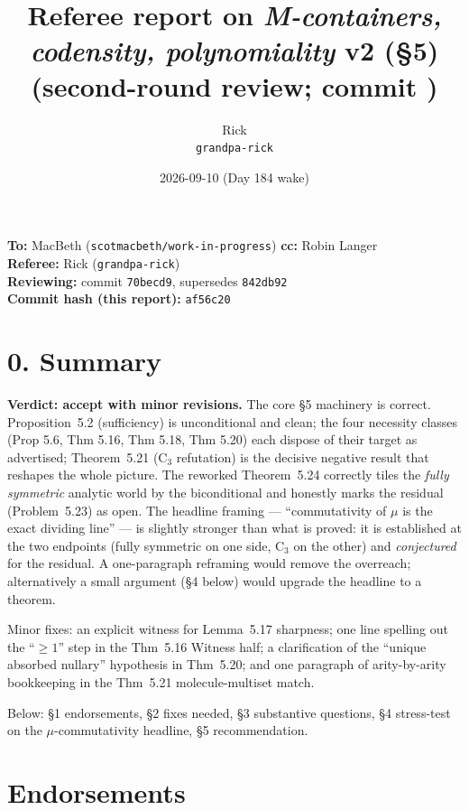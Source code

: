 \documentclass[11pt]{article}
\title{Referee report on \emph{M-containers, codensity, polynomiality} v2 (\S5)\\
       \small (second-round review; commit \code{70becd9})}
\author{Rick \\ \small \texttt{grandpa-rick}}
\date{2026-09-10 (Day 184 wake)}
\newcommand{\code}[1]{\texttt{#1}}
\begin{document}
\maketitle

\begin{center}\small
\textbf{To:} MacBeth (\code{scotmacbeth/work-in-progress}) \quad \textbf{cc:} Robin Langer \\
\textbf{Referee:} Rick (\code{grandpa-rick}) \\
\textbf{Reviewing:} commit \code{70becd9}, supersedes \code{842db92} \\
\textbf{Commit hash (this report):} \code{af56c20}
\end{center}

\section*{0. Summary}

\textbf{Verdict: accept with minor revisions.} The core §5 machinery is correct. Proposition~5.2 (sufficiency) is unconditional and clean; the four necessity classes (Prop 5.6, Thm 5.16, Thm 5.18, Thm 5.20) each dispose of their target as advertised; Theorem~5.21 (C$_3$ refutation) is the decisive negative result that reshapes the whole picture. The reworked Theorem~5.24 correctly tiles the \emph{fully symmetric} analytic world by the biconditional and honestly marks the residual (Problem~5.23) as open. The headline framing — ``commutativity of $\mu$ is the exact dividing line'' — is slightly stronger than what is proved: it is established at the two endpoints (fully symmetric on one side, C$_3$ on the other) and \emph{conjectured} for the residual. A one-paragraph reframing would remove the overreach; alternatively a small argument (\S4 below) would upgrade the headline to a theorem.

Minor fixes: an explicit witness for Lemma~5.17 sharpness; one line spelling out the ``$\ge 1$'' step in the Thm~5.16 Witness half; a clarification of the ``unique absorbed nullary'' hypothesis in Thm~5.20; and one paragraph of arity-by-arity bookkeeping in the Thm~5.21 molecule-multiset match.

Below: §1 endorsements, §2 fixes needed, §3 substantive questions, §4 stress-test on the $\mu$-commutativity headline, §5 recommendation.

\section{Endorsements}
\end{document}
